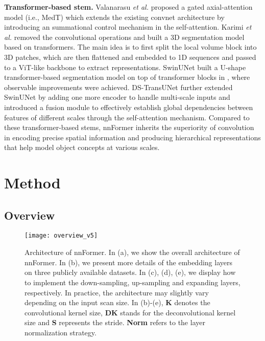 \documentclass[journal,twoside,web]{ieeecolor}
\newcommand{\etal}{\textit{et al.}}
\begin{document}
\noindent \textbf{Transformer-based stem.} Valanarasu \etal \cite{valanarasu2021medical} proposed a gated axial-attention model (i.e., MedT) which extends the existing convnet architecture by introducing an summational control mechanism in the self-attention. Karimi \etal \cite{karimi2021convolution} removed the convolutional operations and built a 3D segmentation model based on transformers. The main idea is to first split the local volume block into 3D patches, which are then flattened and embedded to 1D sequences and passed to a ViT-like backbone to extract representations. SwinUNet \cite{cao2021swin} built a U-shape transformer-based segmentation model on top of transformer blocks in \cite{liu2021swin}, where observable improvements were achieved. DS-TransUNet \cite{lin2021ds} further extended SwinUNet by adding one more encoder to handle multi-scale inputs and introduced a fusion module to effectively establish global dependencies between features of different scales through the self-attention mechanism. Compared to these transformer-based stems, nnFormer inherits the superiority of convolution in encoding precise spatial information and producing hierarchical representations that help model object concepts at various scales.

\section{Method}
\label{sec:method}
\subsection{Overview}
\begin{figure*}[htp]
  \centering
  \texttt{[image: overview\_v5]}
  \caption{Architecture of nnFormer. In (a), we show the overall architecture of nnFormer. In (b), we present more details of the embedding layers on three publicly available datasets. In (c), (d), (e), we display how to implement the down-sampling, up-sampling and expanding layers, respectively. In practice, the architecture may slightly vary depending on the input scan size. In (b)-(e), \textbf{K} denotes the convolutional kernel size, \textbf{DK} stands for the deconvolutional kernel size and \textbf{S} represents the stride. \textbf{Norm} refers to the layer normalization strategy.} 
  \label{overview}
\end{figure*}
\end{document}
